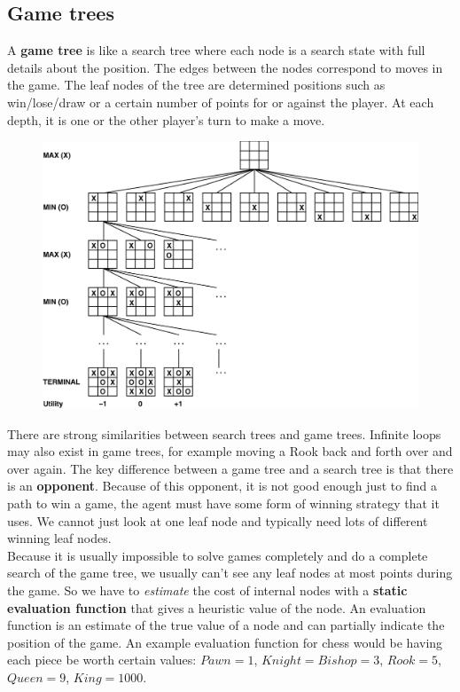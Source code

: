 \documentclass{article}
\newcommand{\n}[0]{\\[\baselineskip]}
\begin{document}
\subsection{Game trees}
A \textbf{game tree} is like a search tree where each node is a search state with full details about the position. The edges between the nodes correspond to moves in the game. The leaf nodes of the tree are determined positions such as win/lose/draw or a certain number of points for or against the player. At each depth, it is one or the other player's turn to make a move.
\begin{figure}[H]
\centering
\includegraphics[width=1\textwidth, keepaspectratio]{imgs/gametree.png}
\end{figure}
\noindent
There are strong similarities between search trees and game trees. Infinite loops may also exist in game trees, for example moving a Rook back and forth over and over again. The key difference between a game tree and a search tree is that there is an \textbf{opponent}. Because of this opponent, it is not good enough just to find a path to win a game, the agent must have some form of winning strategy that it uses. We cannot just look at one leaf node and typically need lots of different winning leaf nodes.
\n
Because it is usually impossible to solve games completely and do a complete search of the game tree, we usually can't see any leaf nodes at most points during the game. So we have to \textit{estimate} the cost of internal nodes with a \textbf{static evaluation function} that gives a heuristic value of the node. An evaluation function is an estimate of the true value of a node and can partially indicate the position of the game. An example evaluation function for chess would be having each piece be worth certain values: $Pawn = 1$, $Knight = Bishop = 3$, $Rook = 5$, $Queen = 9$, $King = 1000$.
\end{document}
